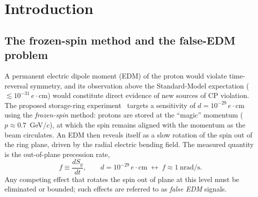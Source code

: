 \documentclass[aps,prab,reprint,superscriptaddress,nofootinbib]{revtex4-2}
\begin{document}
\maketitle

\section{Introduction}
\label{sec:intro}

\subsection{The frozen-spin method and the false-EDM problem}
\label{sec:problem}

A permanent electric dipole moment (EDM) of the proton would violate
time-reversal symmetry, and its observation above the Standard-Model
expectation ($\lesssim 10^{-31}\,e\!\cdot\!$cm) would constitute direct
evidence of new sources of CP violation.  The proposed storage-ring
experiment~\cite{omarov} targets a sensitivity of
$d = 10^{-29}\,e\!\cdot\!$cm using the \emph{frozen-spin} method: protons are
stored at the ``magic'' momentum ($p \approx 0.7$~GeV/$c$), at which the spin
remains aligned with the momentum as the beam circulates.  An EDM then reveals
itself as a slow rotation of the spin out of the ring plane, driven by the
radial electric bending field.  The measured quantity is the out-of-plane
precession rate,
\begin{equation}
  f \equiv \frac{dS_y}{dt}, \qquad
  d = 10^{-29}\,e\!\cdot\!\text{cm} \;\leftrightarrow\;
  f \approx 1~\text{nrad/s}.
  \label{eq:target}
\end{equation}
Any competing effect that rotates the spin out of plane at this level must be
eliminated or bounded; such effects are referred to as \emph{false EDM}
signals.
\end{document}
